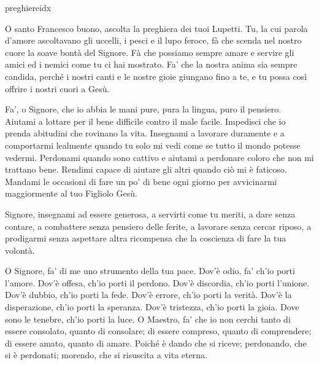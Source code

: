 \documentclass[a4paper,12pt, twoside]{article}
\begin{document}
\begin{songs}{preghiereidx}

\beginverse
O santo Francesco buono,
ascolta la preghiera dei tuoi Lupetti.
Tu, la cui parola d’amore ascoltavano
gli uccelli, i pesci e il lupo feroce,
fà che scenda nel nostro cuore
la soave bontà del Signore.
Fà che possiamo sempre
amare e servire gli amici
ed i nemici come tu ci hai mostrato.
Fa' che la nostra anima sia sempre candida,
perché i nostri canti e le nostre gioie
giungano fino a te, e tu possa così
offrire i nostri cuori a Gesù.

\endverse
\endsong

\begin{intersong}
\bigskip
\end{intersong}

\beginverse
Fa’, o Signore, che io abbia le mani pure,
pura la lingua, puro il pensiero.
Aiutami a lottare per il bene difficile
contro il male facile.
Impedisci che io prenda abitudini
che rovinano la vita.
Insegnami a lavorare duramente
e a comportarmi lealmente
quando tu solo mi vedi
come se tutto il mondo potesse vedermi.
Perdonami quando sono cattivo
e aiutami a perdonare coloro che non mi trattano bene.
Rendimi capace di aiutare gli altri
quando ciò mi è faticoso.
Mandami le occasioni di fare un po’ di bene ogni giorno
per avvicinarmi maggiormente al tuo Figliolo Gesù.

\endverse
\endsong


\beginverse
Signore,
insegnami ad essere generosa,
a servirti come tu meriti,
a dare senza contare,
a combattere senza pensiero delle ferite,
a lavorare senza cercar riposo,
a prodigarmi
senza aspettare altra ricompensa
che la coscienza di fare la tua volontà.


\endverse
\endsong

\begin{intersong}
\bigskip
\end{intersong}


\beginverse
O Signore, fa’ di me uno strumento della tua pace.
Dov’è odio, fa’ ch’io porti l’amore.
Dov’è offesa, ch’io porti il perdono.
Dov’è discordia, ch’io porti l’unione.
Dov’è dubbio, ch’io porti la fede.
Dov’è errore, ch’io porti la verità.
Dov’è la disperazione, ch’io porti la speranza.
Dov’è tristezza, ch’io porti la gioia.
Dove sono le tenebre, ch’io porti la luce.
O Maestro, fa’ che io non cerchi tanto
di essere consolato, quanto di consolare;
di essere compreso, quanto di comprendere;
di essere amato, quanto di amare.
Poiché è dando che si riceve;
perdonando, che si è perdonati;
morendo, che si risuscita a vita eterna.


\end{songs}
\end{document}
